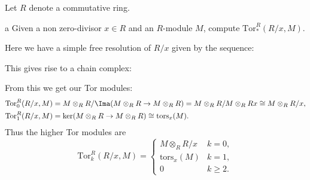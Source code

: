 \documentclass[11pt,letterpaper]{article}
\providecommand{\Tor}{\text{Tor}}
\begin{document}
\begin{solution}
    Let $R$ denote a commutative ring.
    \begin{partproblem}{a}
        Given a non zero-divisor $x\in R$ and an $R$-module $M$, compute $\mathrm{Tor}_*^R(R /x, M)$. 
    \end{partproblem}

    \quad Here we have a simple free resolution of $R/x$ given by the sequence:
    \begin{center}
    \end{center}
    This gives rise to a chain complex:
    \begin{center}
    \end{center}
    From this we get our Tor modules:
    \[
        \begin{aligned}
            \Tor_0^R(R/x, M) &= M\otimes_R R / \Ima(M\otimes_R R \to M\otimes_R R) = M\otimes_R R / M\otimes_R Rx \cong M\otimes_R R/x,\\
            \Tor_1^R(R/x, M) &= \ker(M\otimes_R R \to M\otimes_R R) \cong \text{tors}_x (M).
        \end{aligned}
    \] 
    Thus the higher Tor modules are
    \[
        \Tor_k^R(R/x, M) = \begin{cases}
            M\otimes_R R /x &k=0,\\
            \text{tors}_x(M) &k=1,\\
            0&k\geq 2.
        \end{cases}
    \] 


\end{solution}
\end{document}
